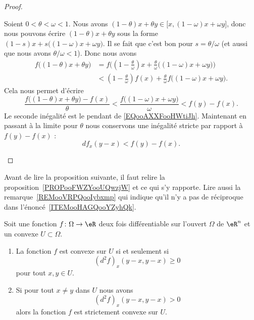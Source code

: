 \begin{proof}
\begin{subproof}
		Soient \( 0<\theta<\omega<1\). Nous avons \( (1-\theta)x+\theta y\in \mathopen[ x , (1-\omega)x+\omega y \mathclose]\), donc nous pouvons écrire \( (1-\theta)x+\theta y\) sous la forme \( (1-s)x+s\big( (1-\omega)x+\omega y \big)\). Il se fait que c'est bon pour \( s=\theta/\omega\) (et aussi que nous avons \( \theta/\omega<1\)). Donc nous avons
		\begin{subequations}
			\begin{align}
				f\big( (1-\theta)x+\theta y \big) & = f\Big( (1-\frac{ \theta }{ \omega })x+\frac{ \theta }{ \omega }\big( (1-\omega)x+\omega y \big) \Big) \\
				                                  & < (1-\frac{ \theta }{ \omega })f(x)+\frac{ \theta }{ \omega }f\big( (1-\omega)x+\omega y \big).
			\end{align}
		\end{subequations}
		Cela nous permet d'écrire
		\begin{equation}
			\frac{ f\big( (1-\theta)x+\theta y \big)-f(x) }{ \theta }<\frac{ f\big( (1-\omega)x+\omega y \big) }{ \omega }<f(y)-f(x).
		\end{equation}
		Le seconde inégalité est le pendant de \eqref{EQooAXXFooHWtiJh}. Maintenant en passant à la limite pour \( \theta\) nous conservons une inégalité stricte par rapport à \( f(y)-f(x)\) :
		\begin{equation}
			df_x(y-x)<f(y)-f(x).
		\end{equation}
	\end{subproof}
\end{proof}

Avant de lire la proposition suivante, il faut relire la proposition~\ref{PROPooFWZYooUQwzjW} et ce qui s'y rapporte.
Lire aussi la remarque~\ref{REMooVRPQooIybxmp} qui indique
qu'il n'y a pas de réciproque dans l'énoncé~\ref{ITEMooHAGQooYZyhQk}.
\begin{proposition}      \label{PROPooBMIRooFkQSAb}
	Soit une fonction \( f\colon \Omega\to \eR\) deux fois différentiable sur l'ouvert \( \Omega\) de \( \eR^n\) et un convexe \( U\subset \Omega\).
	\begin{enumerate}
		\item       \label{ITEMooZQCAooIFjHOn}
		      La fonction \( f\) est convexe sur \( U\) si et seulement si
		      \begin{equation}        \label{EQooIBDCooJYdiBb}
			      (d^2f)_x(y-x,y-x)\geq 0
		      \end{equation}
		      pour tout \( x,y\in U\).
		\item       \label{ITEMooHAGQooYZyhQk}
		      Si pour tout \( x\neq y\) dans \( U\) nous avons
		      \begin{equation}
			      (d^2f)_x(y-x,y-x)>0
		      \end{equation}
		      alors la fonction \( f\) est strictement convexe sur \( U\).
	\end{enumerate}
\end{proposition}

